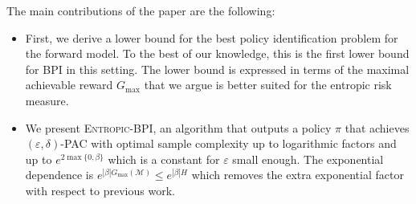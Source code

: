 \documentclass[final,12pt]{colt2026} %
\begin{document}
The main contributions of the paper are the following:
\begin{itemize}
    \item First, we derive a lower bound for the best policy identification problem for the forward model. To the best of our knowledge, this is the first lower bound for BPI in this setting. The lower bound is expressed in terms of the maximal achievable reward $G_{\max}$  that we argue is better suited for the entropic risk measure.
    \item We present \textsc{Entropic-BPI}, an algorithm that outputs a policy $\pi$ that achieves $(\varepsilon,\delta)$-PAC with optimal sample complexity 
    up to logarithmic factors and up to $e^{2\max\{0,\beta\}}$ which is a constant for $\varepsilon$ small enough. The exponential dependence is $e^{|\beta| G_{\text{max}}(\mathcal{M})} \leq e^{|\beta| H}$ which removes the extra exponential factor with respect to previous work. 
\end{itemize}





\end{document}
